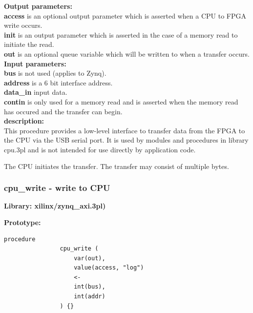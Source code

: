             {\bf Output parameters:} \\
            {\bf access} is an optional output parameter which is asserted
            when a CPU to FPGA write occurs.\\
            {\bf init} is an output parameter which is asserted in the case
            of a memory read to initiate the read.\\
            {\bf out} is an optional queue variable which will be written to
            when a transfer occurs.\\

                       
            {\bf Input parameters:} \\
            {\bf bus} is not used (applies to Zynq).\\
            {\bf address} is a 6 bit interface address.\\
            {\bf data\_in} input data.\\
            {\bf contin} is only used for a memory read and is asserted
            when the memory read has occured and the transfer can begin.\\
                     
            {\bf description:} \\
            This procedure provides a low-level interface to transfer
            data from the FPGA to the CPU via the USB serial port. It is
            used by modules and procedures in library cpu.3pl and is not
            intended for use directly by application code.
            
            The CPU initiates the transfer. The transfer may consist of
            multiple bytes.


        \subsubsection{cpu\_write - write to CPU}\label{sec:lpzynqcpuwr}

            {\bf Library: xilinx/zynq\_axi.3pl)}

            {\bf Prototype:} \\
            \vsp
            \begin{lstlisting}[gobble=12, language=threepl]
                procedure
                cpu_write (
                    var(out),
                    value(access, "log")
                    <-
                    int(bus),
                    int(addr)
                ) {}
            \end{lstlisting}
            
